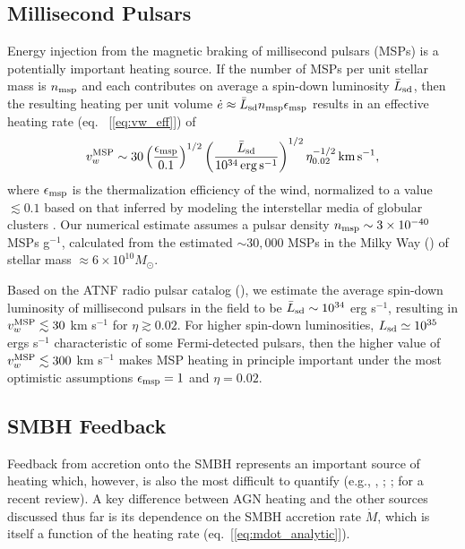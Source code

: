 \documentclass[usenatbib,fleqn]{mn2e}
\begin{document}
\subsection{Millisecond Pulsars}
 Energy injection from the magnetic braking of millisecond pulsars (MSPs) is a potentially
important heating source.  If the number of MSPs per unit stellar mass
is $n_{\rm msp}$ and each contributes on average a spin-down
luminosity $\bar{L}_{\rm sd}$, then the resulting heating per unit
volume $\dot{e} \approx \bar{L}_{\rm sd}n_{\rm msp}\epsilon_{\rm msp}$ results in an
effective heating rate (eq.~ [\ref{eq:vw_eff}]) of 
\begin{eqnarray} v_{w}^{\rm MSP} \sim
30\left(\frac{\epsilon_{\rm msp}}{0.1}\right)^{1/2}\left(\frac{\bar{L}_{\rm
sd}}{10^{34}\,{\rm erg\,s^{-1}}}\right)^{1/2} \eta_{0.02}^{-1/2}\,{\rm
km\,s^{-1}},
 \label{eq:vmsp}
  \end{eqnarray} 
where $\epsilon_{\rm msp}$ is the thermalization efficiency of
the wind, normalized to a value $\lesssim 0.1$ based on that inferred by modeling the interstellar media of globular clusters
\citep{NaimanSoares-Furtado+:2013a}.  Our numerical estimate assumes a
pulsar density $n_{\rm msp} \sim 3 \times 10^{-40} $ MSPs g$^{-1}$, calculated from the estimated $\sim 30,000$ MSPs in the Milky Way (\citealt{Lorimer13}) of stellar mass $\approx 6\times 10^{10}M_{\odot}$.

Based on the ATNF radio pulsar catalog (\citealt{Manchester+05}), we estimate the average spin-down luminosity of millisecond pulsars in the field to be $\bar{L}_{\rm sd} \sim 10^{34}$ erg s$^{-1}$, resulting in $v_{w}^{\rm MSP} \lesssim 30$ km s$^{-1}$ for $\eta \gtrsim 0.02$.  For higher spin-down
luminosities, $L_{\rm sd}\simeq 10^{35}$ ergs s$^{-1}$ characteristic
of some Fermi-detected pulsars, then the higher value of $v_{w}^{\rm MSP}
\lesssim 300$ km s$^{-1}$ makes MSP heating in principle important
under the most optimistic assumptions $\epsilon_{\rm msp} = 1$ and $\eta = 0.02$.


\subsection{SMBH Feedback}

Feedback from accretion onto the SMBH represents an important source of heating which, however, is also the most difficult to quantify (e.g., \citealt{Brighenti&Mathews03}, \citealt{DiMatteo+05}; \citealt{Kurosawa&Proga09}; \citealt{Fabian12} for a recent review).  A key difference between AGN heating and the other sources discussed thus far is its dependence on the SMBH accretion rate $\dot{M}$, which is itself a function of the heating rate (eq.~[\ref{eq:mdot_analytic}]).  
\end{document}
